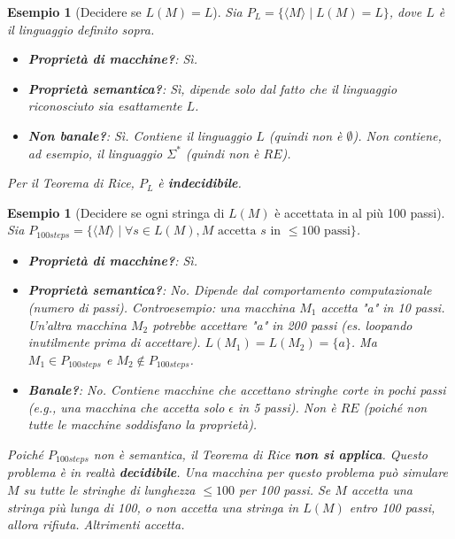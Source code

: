 \documentclass[a4paper, 11pt]{book} %
\newtheorem{example}[theorem]{Esempio}
\theoremstyle{definition}
\begin{document}
\begin{example}[Decidere se $L(M)=L$]
Sia $P_L = \{\langle M \rangle \mid L(M) = L\}$, dove $L$ è il linguaggio definito sopra.
\begin{itemize}
    \item \textbf{Proprietà di macchine?}: Sì.
    \item \textbf{Proprietà semantica?}: Sì, dipende solo dal fatto che il linguaggio riconosciuto sia esattamente $L$.
    \item \textbf{Non banale?}: Sì. Contiene il linguaggio $L$ (quindi non è $\emptyset$). Non contiene, ad esempio, il linguaggio $\Sigma^*$ (quindi non è $RE$).
\end{itemize}
Per il Teorema di Rice, $P_L$ è \textbf{indecidibile}.
\end{example}

\begin{example}[Decidere se ogni stringa di $L(M)$ è accettata in al più 100 passi]
Sia $P_{100steps} = \{\langle M \rangle \mid \forall s \in L(M), M \text{ accetta } s \text{ in } \le 100 \text{ passi}\}$.
\begin{itemize}
    \item \textbf{Proprietà di macchine?}: Sì.
    \item \textbf{Proprietà semantica?}: No. Dipende dal comportamento computazionale (numero di passi). Controesempio: una macchina $M_1$ accetta "a" in 10 passi. Un'altra macchina $M_2$ potrebbe accettare "a" in 200 passi (es. loopando inutilmente prima di accettare). $L(M_1) = L(M_2) = \{a\}$. Ma $M_1 \in P_{100steps}$ e $M_2 \notin P_{100steps}$.
    \item \textbf{Banale?}: No. Contiene macchine che accettano stringhe corte in pochi passi (e.g., una macchina che accetta solo $\epsilon$ in 5 passi). Non è $RE$ (poiché non tutte le macchine soddisfano la proprietà).
\end{itemize}
Poiché $P_{100steps}$ non è semantica, il Teorema di Rice \textbf{non si applica}. Questo problema è in realtà \textbf{decidibile}. Una macchina per questo problema può simulare $M$ su tutte le stringhe di lunghezza $\le 100$ per 100 passi. Se $M$ accetta una stringa più lunga di 100, o non accetta una stringa in $L(M)$ entro 100 passi, allora rifiuta. Altrimenti accetta.
\end{example}
\end{document}
